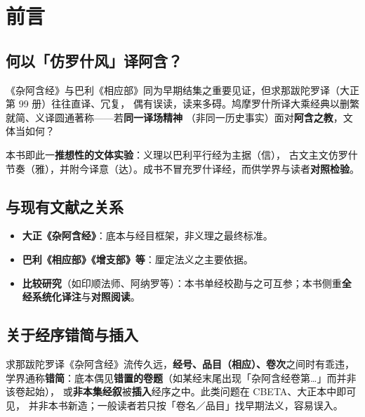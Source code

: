 
\chapter*{前言}

\section*{何以「仿罗什风」译阿含？}

《杂阿含经》与巴利《相应部》同为早期结集之重要见证，但求那跋陀罗译（大正第 99 册）往往直译、冗复，
偶有误读，读来多碍。鸠摩罗什所译大乘经典以删繁就简、义译圆通著称——若\textbf{同一译场精神}
（非同一历史事实）面对\textbf{阿含之教}，文体当如何？

本书即此一\textbf{推想性的文体实验}：义理以巴利平行经为主据（信），
古文主文仿罗什节奏（雅），并附今译意（达）。成书不冒充罗什译经，而供学界与读者\textbf{对照检验}。

\section*{与现有文献之关系}

\begin{itemize}
  \item \textbf{大正《杂阿含经》}：底本与经目框架，非义理之最终标准。
  \item \textbf{巴利《相应部》《增支部》等}：厘定法义之主要依据。
  \item \textbf{比较研究}（如印顺法师、阿纳罗等）：本书单经校勘与之可互参；本书侧重\textbf{全经系统化译注}与\textbf{对照阅读}。
\end{itemize}

\section*{关于经序错简与插入}

求那跋陀罗译《杂阿含经》流传久远，\textbf{经号、品目（相应）、卷次}之间时有乖违，
学界通称\textbf{错简}：底本偶见\textbf{错置的卷题}（如某经末尾出现「杂阿含经卷第…」而并非该卷起始），
或\textbf{非本集经叙}被\textbf{插入}经序之中。此类问题在 CBETA、大正本中即可见，
并非本书新造；一般读者若只按「卷名／品目」找早期法义，容易误入。

